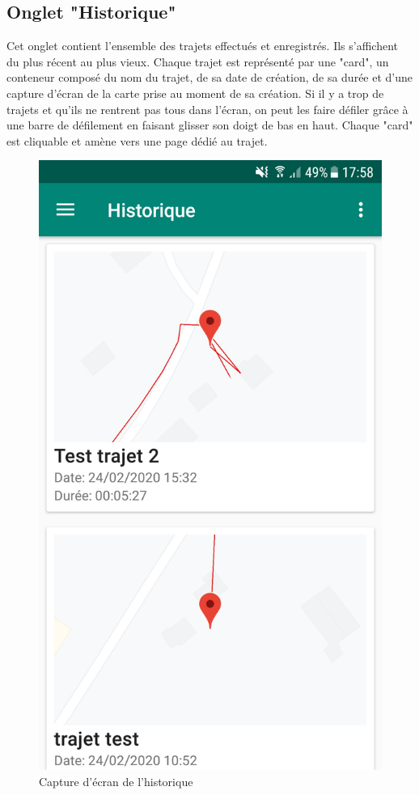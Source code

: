 \documentclass{article}
\begin{document}
\subsection{Onglet "Historique"}
Cet onglet contient l'ensemble des trajets effectués et enregistrés. Ils s'affichent du plus récent au plus vieux. Chaque trajet est représenté
par une "card", un conteneur composé du nom du trajet, de sa date de création, de sa durée et d'une capture d'écran de la carte prise au moment
de sa création. Si il y a trop de trajets et qu'ils ne rentrent pas tous dans l'écran, on peut les faire défiler grâce à une barre de défilement
en faisant glisser son doigt de bas en haut. Chaque "card" est cliquable et amène vers une page dédié au trajet.
\begin{figure}[ht]
  \label{Historique}
  \centering
  \includegraphics[scale=0.13]{images/historique.png}
  \caption{Capture d'écran de l'historique}
\end{figure}
\end{document}
